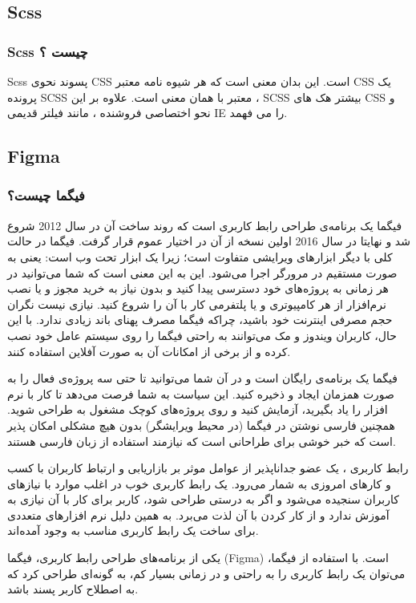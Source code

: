 \subsection{Scss}
\subsubsection{Scss چیست ؟}
Scss پسوند نحوی CSS است. این بدان معنی است که هر شیوه نامه معتبر CSS یک پرونده SCSS معتبر با همان معنی است. علاوه بر این ، SCSS بیشتر هک های CSS و نحو اختصاصی فروشنده ، مانند فیلتر قدیمی IE را می فهمد.


\subsection{Figma}
\subsubsection{فیگما چیست؟}
فیگما یک برنامه‌ی طراحی رابط کاربری است که روند ساخت آن در سال 2012 شروع شد و نهایتا در سال 2016 اولین نسخه از آن در اختیار عموم قرار گرفت. فیگما در حالت کلی با دیگر ابزارهای ویرایشی متفاوت است؛ زیرا یک ابزار تحت وب 
 است: یعنی به صورت مستقیم در مرورگر اجرا می‌شود. این به این معنی است که شما می‌توانید در هر زمانی به پروژه‌های خود دسترسی پیدا کنید و بدون نیاز به خرید مجوز و یا نصب نرم‌افزار از هر کامپیوتری و یا پلتفرمی کار با آن را شروع کنید. نیازی نیست نگران حجم مصرفی اینترنت خود باشید، چراکه فیگما مصرف پهنای باند زیادی ندارد. با این حال، کاربران ویندوز و مک می‌توانند به راحتی فیگما را روی سیستم عامل خود نصب کرده و از برخی از امکانات آن‌ به صورت آفلاین استفاده کنند.

فیگما یک برنامه‌ی رایگان است و در آن شما می‌توانید تا حتی سه پروژه‌ی فعال را به صورت همزمان ایجاد و ذخیره کنید. این سیاست به شما فرصت می‌دهد تا کار با نرم افزار را یاد بگیرید، آزمایش کنید و روی پروژه‌های کوچک مشغول به طراحی شوید. همچنین فارسی نوشتن در فیگما (در محیط ویرایشگر) بدون هیچ مشکلی امکان پذیر است که خبر خوشی برای طراحانی است که نیازمند استفاده از زبان فارسی هستند.

رابط کاربری
، یک عضو جداناپذیر از عوامل موثر بر بازاریابی و ارتباط کاربران با کسب و کارهای امروزی به شمار می‌رود. یک رابط کاربری خوب در اغلب موارد با نیازهای کاربران سنجیده می‌شود و اگر به درستی طراحی شود، کاربر برای کار با آن نیازی به آموزش ندارد و از کار کردن با آن لذت می‌برد. به همین دلیل نرم افزارهای متعددی برای ساخت یک رابط کاربری مناسب به وجود آمده‌اند.

یکی از برنامه‌های طراحی رابط کاربری، فیگما (Figma) است. با استفاده از فیگما، می‌توان یک رابط کاربری را به راحتی و در زمانی بسیار کم، به گونه‌ای طراحی کرد که به اصطلاح 
کاربر پسند
 باشد.
